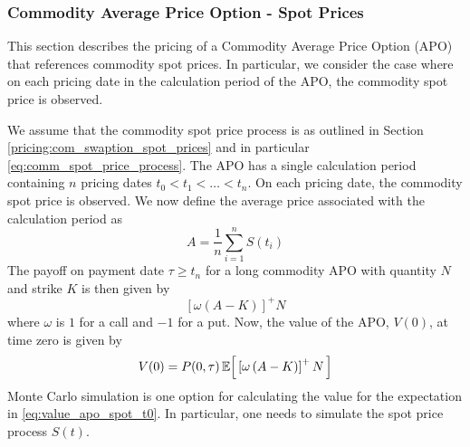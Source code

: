 \subsubsection{Commodity Average Price Option - Spot Prices}
\label{pricing:com_apo_spot_prices}
This section describes the pricing of a Commodity Average Price Option (APO) that references commodity spot prices. In particular, we consider the case where on each pricing date in the calculation period of the APO, the commodity spot price is observed.

We assume that the commodity spot price process is as outlined in Section \ref{pricing:com_swaption_spot_prices} and in particular \eqref{eq:comm_spot_price_process}. The APO has a single calculation period containing $n$ pricing dates $t_0 < t_1 < \ldots < t_n$. On each pricing date, the commodity spot price is observed. We now define the average price associated with the calculation period as
\begin{equation}
\label{eq:comm_apo_spot_A}
A = \frac{1}{n} \sum_{i=1}^{n} S(t_{i})
\end{equation}
The payoff on payment date $\tau \geq t_n$ for a long commodity APO with quantity $N$ and strike $K$ is then given by
\begin{equation}
\left[ \omega \left( A - K \right) \right]^{+} N
\end{equation}
where $\omega$ is $1$ for a call and $-1$ for a put. Now, the value of the APO, $V(0)$, at time zero is given by
\begin{equation}
\label{eq:value_apo_spot_t0}
V(0) = P(0, \tau) \Ex{ \left[ \omega \left( A - K \right) \right]^{+} N }
\end{equation}
Monte Carlo simulation is one option for calculating the value for the expectation in \eqref{eq:value_apo_spot_t0}. In particular, one needs to simulate the spot price process $S(t)$.

